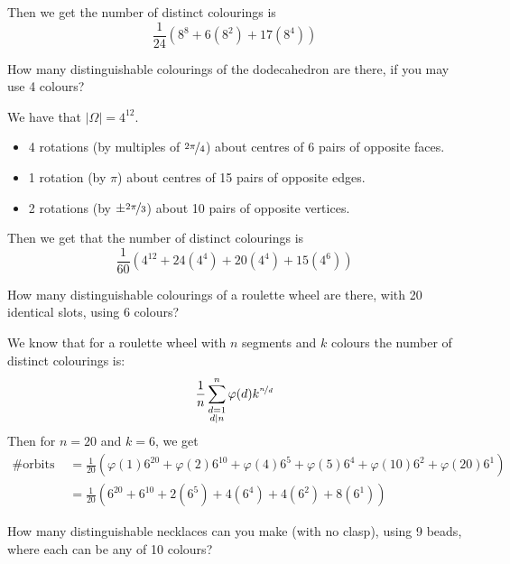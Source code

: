 \documentclass[12pt, answers]{exam}
\begin{document}
\begin{questions}
\begin{solution}
            Then we get the number of distinct colourings is
            \[ \frac{1}{24} \left(8^8 + 6\left(8^2\right) + 17\left(8^4\right)\right) \]
        \end{solution}

        \question How many distinguishable colourings of the dodecahedron are there, if
        you may use 4 colours?

        \begin{solution}
            We have that $|\Omega| = 4^{12}$.
            \begin{itemize}
                \item 4 rotations (by multiples of $\nicefrac{2\pi}{4}$) about centres of 6 pairs of opposite faces.
                \item 1 rotation  (by $\pi$) about centres of 15 pairs of opposite edges.
                \item 2 rotations (by $\pm \nicefrac{2\pi}{3}$) about 10 pairs of opposite vertices.
            \end{itemize}
            Then we get that the number of distinct colourings is
            \[ \frac{1}{60}\left(4^{12} + 24\left(4^4\right) + 20\left(4^4\right) + 15\left(4^6\right)\right) \]
        \end{solution}

        \question How many distinguishable colourings of a roulette wheel are there, with
        20 identical slots, using 6 colours?

        \begin{solution}
            We know that for a roulette wheel with $n$ segments and $k$ colours the number of distinct colourings is:
            \[ \frac{1}{n}\sum_{\substack{d = 1 \\ d \mathrel{|} n}}^n \varphi(d)k^{\nicefrac{n}{d}}\]
            Then for $n = 20$ and $k = 6$, we get
            \begin{align*}
                \#\text{orbits } &= \frac{1}{20}\left( \varphi(1)6^{20} + \varphi(2)6^{10} + \varphi(4)6^5 + \varphi(5)6^4 +
                \varphi(10)6^2 + \varphi(20)6^1\right) \\
                &= \frac{1}{20}\left(6^{20} + 6^{10} + 2\left(6^{5}\right) + 4\left(6^4\right) + 4\left(6^2\right)
                    + 8\left(6^1\right)\right)
            \end{align*}
        \end{solution}

        \question  How many distinguishable necklaces can you make (with no clasp), using
        9 beads, where each can be any of 10 colours?


\end{questions}
\end{document}
